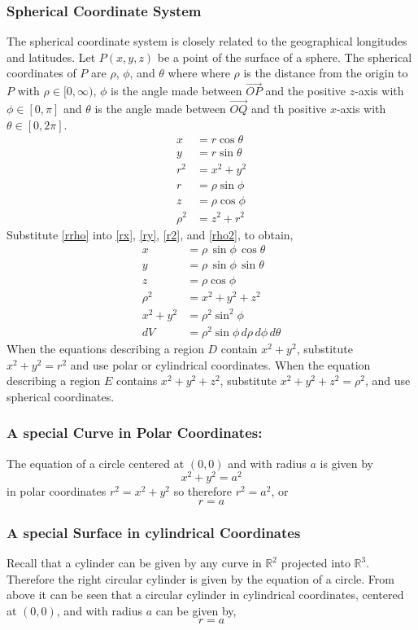\documentclass[14pt]{article}
\begin{document}
    \subsubsection{Spherical Coordinate System} 
    The spherical coordinate system is closely related to the geographical longitudes and latitudes. Let $P(x,y,z)$ be a point of the surface of a sphere. The spherical coordinates of $P$ are $\rho$, $\phi$, and $\theta$ where where $\rho$ is the distance from the origin to $P$ with $\rho\in[0,\infty)$, $\phi$ is the angle made between $\vec {OP}$ and the positive $z$-axis with $\phi\in[0, \pi]$ and $\theta$ is the angle made between $\vec{OQ}$ and th positive $x$-axis with $\theta\in[0,2\pi]$.
    \begin{align}
        x&=r\cos\theta\label{rx}\\
        y&=r\sin\theta\label{ry}\\
        r^2&=x^2+y^2\label{r2}\\
        r&=\rho\sin\phi\label{rrho}\\
        z&=\rho\cos\phi\label{zrho}\\
        \rho^2&=z^2+r^2\label{rho2}
    \end{align}
    Substitute \eqref{rrho} into \eqref{rx}, \eqref{ry}, \eqref{r2}, and \eqref{rho2}, to obtain,
    \begin{align*}
        x&=\rho\,\sin\phi\,\cos\theta\\
        y&=\rho\,\sin\phi\,\sin\theta\\
        z&=\rho\cos\phi\\
        \rho^2&=x^2+y^2+z^2\\
        x^2+y^2&=\rho^2\sin^2\phi\\
        dV&=\rho^2\sin\phi\,d\rho\, d\phi\, d\theta
    \end{align*}
    When the equations describing a region $D$ contain $x^2+y^2$, substitute $x^2+y^2=r^2$ and use polar or cylindrical coordinates. When the equation describing a region $E$ contains $x^2+y^2+z^2$, substitute $x^2+y^2+z^2=\rho^2$, and use spherical coordinates.
    \subsubsection{A special Curve in Polar Coordinates:}
    The equation of a circle centered at $(0,0)$ and with radius $a$ is given by 
    $$x^2+y^2=a^2$$
    in polar coordinates $r^2=x^2+y^2$ so therefore $r^2=a^2$, or
    $$r=a$$
    \subsubsection{A special Surface in cylindrical Coordinates}
    Recall that a cylinder can be given by any curve in $\mathbb{R}^2$ projected into $\mathbb{R}^3$. Therefore the right circular cylinder is given by the equation of a circle. From above it can be seen that a circular cylinder in cylindrical coordinates, centered at $(0,0)$, and with radius $a$ can be given by,
    $$r=a$$
\end{document}
